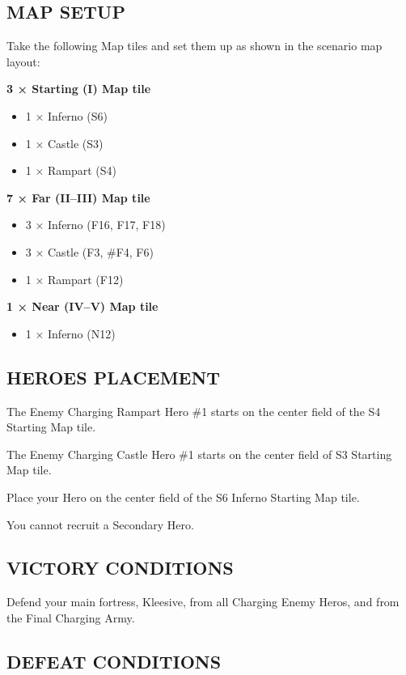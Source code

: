 \begin{multicols*}{2}
\subsection*{\MakeUppercase{Map setup}}

Take the following Map tiles and set them up as shown in the scenario map layout:

\textbf{3 × Starting (I) Map tile}
\begin{itemize}
  \item 1 × Inferno (S6)
  \item 1 × Castle (S3)
  \item 1 × Rampart (S4)
\end{itemize}

\textbf{7 × Far (II--III) Map tile}
\begin{itemize}
  \item 3 × Inferno (F16, F17, F18)
  \item 3 × Castle (F3, \#F4, F6)
  \item 1 × Rampart (F12)
\end{itemize}

\textbf{1 × Near (IV--V) Map tile}
\begin{itemize}
  \item 1 × Inferno (N12)
\end{itemize}

\subsection*{\MakeUppercase{Heroes placement}}

The Enemy Charging Rampart Hero \#1 starts on the center field of the S4 Starting Map tile.

The Enemy Charging Castle Hero \#1 starts on the center field of S3 Starting Map tile.

Place your Hero on the center field of the S6 Inferno Starting Map tile.

You cannot recruit a Secondary Hero.

\subsection*{\MakeUppercase{Victory Conditions}}

Defend your main fortress, Kleesive, from all Charging Enemy Heros, and from the Final Charging Army.

\subsection*{\MakeUppercase{Defeat Conditions}}


\end{multicols*}
